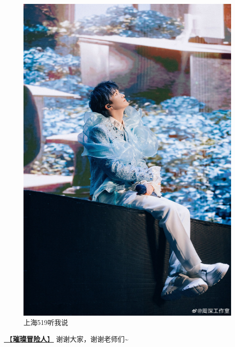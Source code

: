 \documentclass[]{ctexbook}
\begin{document}
\begin{figure}

{\centering \includegraphics[width=400pt]{img/shanghai20240519/001} 

}

\caption{上海519听我说}\label{fig:unnamed-chunk-41}
\end{figure}

\hyperref[adventurers]{🎵【\textbf{璀璨冒险人}】} 谢谢大家，谢谢老师们\textasciitilde{}
\end{document}

